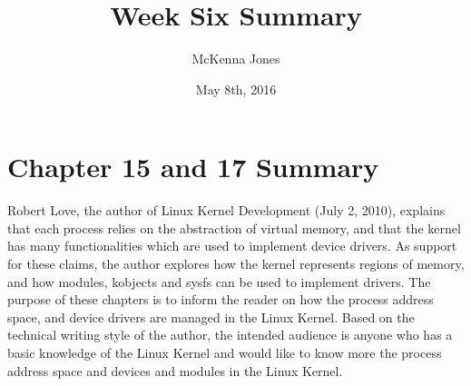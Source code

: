 \documentclass[letterpaper,10pt]{article}
\title{Week Six Summary}
\author{McKenna Jones}
\date{May 8th, 2016}
\begin{document}
\begin{titlepage}
\maketitle
\end{titlepage}

\section{Chapter 15 and 17 Summary}
Robert Love, the author of Linux Kernel Development (July 2, 2010), explains that each process relies on the abstraction of virtual memory, and that the kernel has many functionalities which are used to implement device drivers. As support for these claims, the author explores how the kernel represents regions of memory, and how modules, kobjects and sysfs can be used to implement drivers. The purpose of these chapters is to inform the reader on how the process address space, and device drivers are managed in the Linux Kernel. Based on the technical writing style of the author, the intended audience is anyone who has a basic knowledge of the Linux Kernel and would like to know more the process address space and devices and modules in the Linux Kernel.
\end{document}
